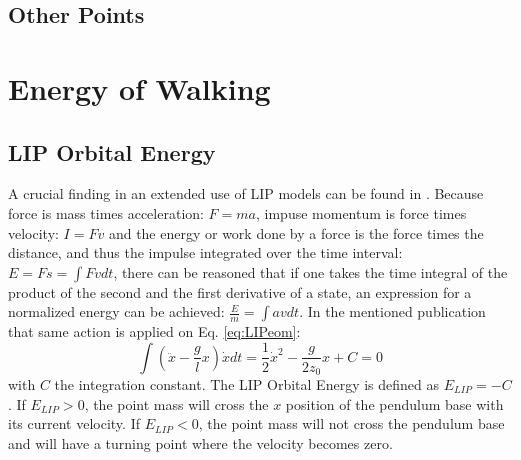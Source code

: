 \subsection{Other Points}





\section{Energy of Walking}
\subsection{LIP Orbital Energy} 
A crucial finding in an extended use of \ac{LIP} models can be found in \cite{kajita1992dynamic}. Because force is mass times acceleration: $F=ma$, impuse momentum is force times velocity: $I=Fv$ and the energy or work done by a force is the force times the distance, and thus the impulse integrated over the time interval: $E = Fs = \int Fv dt$, there can be reasoned that if one takes the time integral of the product of the second and the first derivative of a state, an expression for a normalized energy can be achieved: $\frac{E}{m}=\int av dt$. In the mentioned publication that same action is applied on Eq. \eqref{eq:LIPeom}:
\begin{equation}
\int (\ddot{x}-\frac{g}{l}x)\dot{x} dt = \frac{1}{2}\dot{x}^2-\frac{g}{2z_0}x +C=0
\label{eq:Elip}
\end{equation}
with $C$ the integration constant. The \ac{LIP} Orbital Energy is defined as $E_{LIP}=-C$. If $E_{LIP}>0$, the point mass will cross the $x$ position of the pendulum base with its current velocity. If $E_{LIP}<0$, the point mass will not cross the pendulum base and will have a turning point where the velocity becomes zero.


